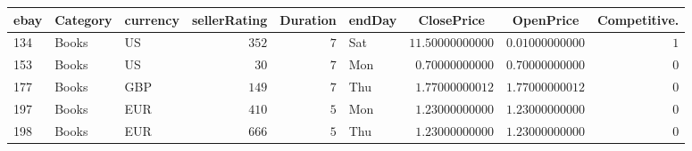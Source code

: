 \begin{table}[!tbp]
\begin{center}
\begin{tabular}{lllrrlrrr}
\hline\hline
\multicolumn{1}{l}{ebay}&\multicolumn{1}{c}{Category}&\multicolumn{1}{c}{currency}&\multicolumn{1}{c}{sellerRating}&\multicolumn{1}{c}{Duration}&\multicolumn{1}{c}{endDay}&\multicolumn{1}{c}{ClosePrice}&\multicolumn{1}{c}{OpenPrice}&\multicolumn{1}{c}{Competitive.}\tabularnewline
\hline
134&Books&US&$352$&$7$&Sat&$11.50000000000$&$0.01000000000$&$1$\tabularnewline
153&Books&US&$ 30$&$7$&Mon&$ 0.70000000000$&$0.70000000000$&$0$\tabularnewline
177&Books&GBP&$149$&$7$&Thu&$ 1.77000000012$&$1.77000000012$&$0$\tabularnewline
197&Books&EUR&$410$&$5$&Mon&$ 1.23000000000$&$1.23000000000$&$0$\tabularnewline
198&Books&EUR&$666$&$5$&Thu&$ 1.23000000000$&$1.23000000000$&$0$\tabularnewline
\hline
\end{tabular}\end{center}
\end{table}
